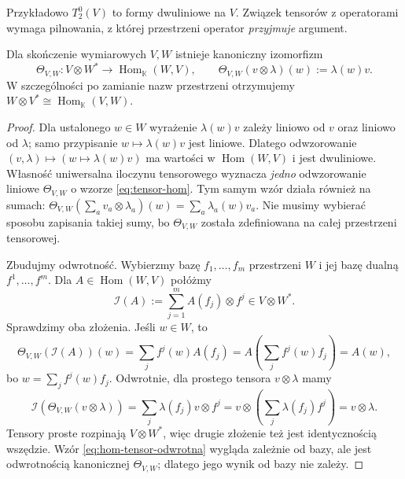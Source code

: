Przykładowo $T^0_2(V)$ to formy dwuliniowe na $V$.
Związek tensorów z operatorami wymaga pilnowania,
z której przestrzeni operator \emph{przyjmuje} argument.

\begin{twierdzenie}
\label{thm:tensor-hom}
Dla skończenie wymiarowych $V,W$ istnieje kanoniczny izomorfizm
\begin{equation}\label{eq:tensor-hom}
 \Theta_{V,W}\colon V\otimes W^*\longrightarrow
 \operatorname{Hom}_{\mathbb K}(W,V),\qquad
 \Theta_{V,W}(v\otimes\lambda)(w):=\lambda(w)v.
\end{equation}
W szczególności po zamianie nazw przestrzeni otrzymujemy
$W\otimes V^*\cong\operatorname{Hom}_{\mathbb K}(V,W)$.
\end{twierdzenie}
\begin{proof}
Dla ustalonego $w\in W$ wyrażenie $\lambda(w)v$ zależy
liniowo od $v$ oraz liniowo od $\lambda$; samo przypisanie
$w\mapsto\lambda(w)v$ jest liniowe. Dlatego odwzorowanie
$(v,\lambda)\mapsto(w\mapsto\lambda(w)v)$ ma wartości
w $\operatorname{Hom}(W,V)$ i jest dwuliniowe.
Własność uniwersalna iloczynu tensorowego wyznacza
\emph{jedno} odwzorowanie liniowe $\Theta_{V,W}$ o wzorze
\eqref{eq:tensor-hom}. Tym samym wzór działa również
na sumach: $\Theta_{V,W}(\sum_a v_a\otimes\lambda_a)(w)
=\sum_a\lambda_a(w)v_a$. Nie musimy wybierać sposobu
zapisania takiej sumy, bo $\Theta_{V,W}$ została zdefiniowana
na całej przestrzeni tensorowej.

Zbudujmy odwrotność. Wybierzmy bazę $f_1,\ldots,f_m$
przestrzeni $W$ i jej bazę dualną $f^1,\ldots,f^m$.
Dla $A\in\operatorname{Hom}(W,V)$ połóżmy
\begin{equation}\label{eq:hom-tensor-odwrotna}
 \mathcal I(A):=\sum_{j=1}^m A(f_j)\otimes f^j\in V\otimes W^*.
\end{equation}
Sprawdzimy oba złożenia. Jeśli $w\in W$, to
\[
 \Theta_{V,W}(\mathcal I(A))(w)
 =\sum_j f^j(w)A(f_j)
 =A\!\left(\sum_j f^j(w)f_j\right)=A(w),
\]
bo $w=\sum_j f^j(w)f_j$. Odwrotnie, dla prostego
tensora $v\otimes\lambda$ mamy
\[
 \mathcal I(\Theta_{V,W}(v\otimes\lambda))
 =\sum_j\lambda(f_j)v\otimes f^j
 =v\otimes\left(\sum_j\lambda(f_j)f^j\right)
 =v\otimes\lambda.
\]
Tensory proste rozpinają $V\otimes W^*$, więc drugie
złożenie też jest identycznością wszędzie. Wzór
\eqref{eq:hom-tensor-odwrotna} wygląda zależnie od bazy,
ale jest odwrotnością kanonicznej $\Theta_{V,W}$;
dlatego jego wynik od bazy nie zależy.
\end{proof}

